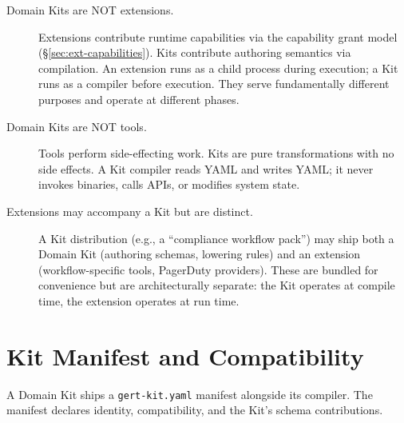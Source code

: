 \begin{description}
  \item[Domain Kits are NOT extensions.] Extensions contribute runtime
    capabilities via the capability grant model
    (\S\ref{sec:ext-capabilities}).  Kits contribute authoring semantics via
    compilation.  An extension runs as a child process during execution; a Kit
    runs as a compiler before execution.  They serve fundamentally different
    purposes and operate at different phases.

  \item[Domain Kits are NOT tools.] Tools perform side-effecting work.  Kits
    are pure transformations with no side effects.  A Kit compiler reads YAML
    and writes YAML; it never invokes binaries, calls APIs, or modifies system
    state.

  \item[Extensions may accompany a Kit but are distinct.] A Kit distribution
    (e.g., a ``compliance workflow pack'') may ship both a Domain Kit (authoring
    schemas, lowering rules) and an extension (workflow-specific tools,
    PagerDuty providers).  These are bundled for convenience but are
    architecturally separate: the Kit operates at compile time, the extension
    operates at run time.
\end{description}

\section{Kit Manifest and Compatibility}
\label{sec:kit-manifest}

A Domain Kit ships a \texttt{gert-kit.yaml} manifest alongside its compiler.
The manifest declares identity, compatibility, and the Kit's schema
contributions.

